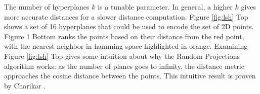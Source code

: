The number of hyperplanes $k$ is a tunable parameter. In general, a higher $k$ gives more accurate distances for a slower distance computation. Figure \ref{fig:lsh} Top shows a set of 16 hyperplanes that could be used to encode the set of 2D points. Figure 1 Bottom ranks the points based on their distance from the red point, with the nearest neighbor in hamming space highlighted in orange. Examining Figure \ref{fig:lsh} Top gives some intuition about why the Random Projections algorithm works: as the number of planes goes to infinity, the distance metric approaches the cosine distance between the points. This intuitive result is proven by Charikar \cite{charikar2002similarity}.

